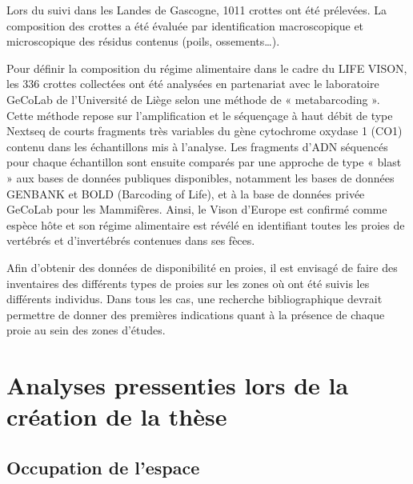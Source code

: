 \documentclass[
  letterpaper,
  DIV=11,
  numbers=noendperiod]{scrreprt}
\begin{document}
Lors du suivi dans les Landes de Gascogne, 1011 crottes ont été
prélevées. La composition des crottes a été évaluée par identification
macroscopique et microscopique des résidus contenus (poils,
ossements\ldots).

Pour définir la composition du régime alimentaire dans le cadre du LIFE
VISON, les 336 crottes collectées ont été analysées en partenariat avec
le laboratoire GeCoLab de l'Université de Liège selon une méthode de «
metabarcoding ». Cette méthode repose sur l'amplification et le
séquençage à haut débit de type Nextseq de courts fragments très
variables du gène cytochrome oxydase 1 (CO1) contenu dans les
échantillons mis à l'analyse. Les fragments d'ADN séquencés pour chaque
échantillon sont ensuite comparés par une approche de type « blast » aux
bases de données publiques disponibles, notamment les bases de données
GENBANK et BOLD (Barcoding of Life), et à la base de données privée
GeCoLab pour les Mammifères. Ainsi, le Vison d'Europe est confirmé comme
espèce hôte et son régime alimentaire est révélé en identifiant toutes
les proies de vertébrés et d'invertébrés contenues dans ses fèces.

Afin d'obtenir des données de disponibilité en proies, il est envisagé
de faire des inventaires des différents types de proies sur les zones où
ont été suivis les différents individus. Dans tous les cas, une
recherche bibliographique devrait permettre de donner des premières
indications quant à la présence de chaque proie au sein des zones
d'études.

\chapter{Analyses pressenties lors de la création de la
thèse}\label{analyses-pressenties-lors-de-la-cruxe9ation-de-la-thuxe8se}

\section{Occupation de l'espace}\label{occupation-de-lespace}
\end{document}
